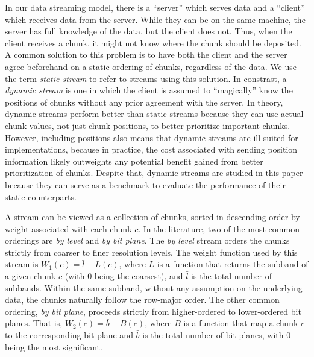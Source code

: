 In our data streaming model, there is a ``server'' which serves data and a ``client'' which receives
data from the server. While they can be on the same machine, the server has full knowledge of the
data, but the client does not. Thus, when the client receives a chunk, it might not know where the
chunk should be deposited. A common solution to this problem is to have both the client and the
server agree beforehand on a static ordering of chunks, regardless of the data. We use the term
\emph{static stream} to refer to streams using this solution. In constrast, a \emph{dynamic stream}
is one in which the client is assumed to ``magically'' know the positions of chunks without any
prior agreement with the server. In theory, dynamic streams perform better than static streams
because they can use actual chunk values, not just chunk positions, to better prioritize important
chunks. However, including positions also means that dynamic streams are ill-suited for implementations, because in
practice, the cost associated with sending position information likely outweights any potential
benefit gained from better prioritization of chunks. Despite that, dynamic streams are studied in
this paper because they can serve as a benchmark to evaluate the performance of their static
counterparts.

A stream can be viewed as a collection of chunks, sorted in descending order by weight
associated with each chunk $c$. In the literature, two of the most common orderings are \emph{by
level} and \emph{by bit plane}. The \emph{by level} stream orders the chunks strictly from coarser
to finer resolution levels. The weight function used by this stream is $W_1(c)=\bar{l}-L(c)$, where
$L$ is a function that returns the subband of a given chunk $c$ (with $0$ being the coarsest), and
$\bar{l}$ is the total number of subbands. Within the same subband, without any assumption on the
underlying data, the chunks naturally follow the row-major order. The other common ordering,
\emph{by bit plane}, proceeds strictly from higher-ordered to lower-ordered bit planes. That is,
$W_2(c)=\bar{b}-B(c)$, where $B$ is a function that map a chunk $c$ to the corresponding bit plane
and $\bar{b}$ is the total number of bit planes, with $0$ being the most significant.

